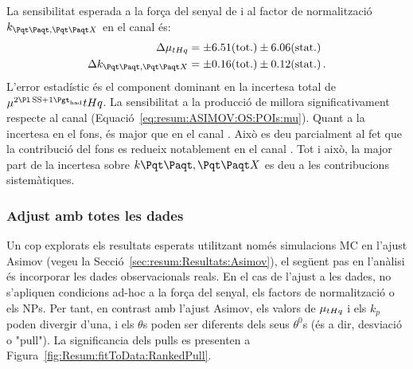 La sensibilitat esperada a la força del senyal de \tHq i al factor de normalització $k_{\ttbar, \ttX}$ en el canal \dilepSStau és:
\begin{align}
\Delta \mu_{\tHq} &= \pm 6.51 (\text{tot.}) \pm 6.06 (\text{stat.}) \label{eq:resum:Fit:ASIMOV:SS:mu} \\
\Delta k_{\ttbar, \ttX} 	&= \pm 0.16 (\text{tot.}) \pm 0.12 (\text{stat.})\label{eq:resum:Fit:ASIMOV:SS:k} \, .
\end{align}
L'error estadístic és el component dominant en la incertesa total de $\mu^{\dilepSStau}{\tHq}$. La sensibilitat a la producció de \tHq millora significativament respecte al canal \dilepOStau (Equació~\ref{eq:resum:ASIMOV:OS:POIs:mu}). Quant a la incertesa en el fons, és major que en el canal \dilepOStau. Això es deu parcialment al fet que la contribució del fons es redueix notablement en el canal \dilepSStau. Tot i això, la major part de la incertesa sobre $k{\ttbar, \ttX}$ es deu a les contribucions sistemàtiques. 



\subsubsection{Adjust amb totes les dades}
\label{sec:resum:Resultats:FullFit}

Un cop explorats els resultats esperats utilitzant només simulacions MC en l'ajust Asimov (vegeu la Secció~\ref{sec:resum:Resultats:Asimov}), 
el següent pas en l'anàlisi és incorporar les dades observacionals reals.
En el cas de l'ajust a les dades, no s'apliquen condicions ad-hoc a la força del senyal, els factors de normalització o els NPs. 
Per tant, en contrast amb l'ajust Asimov, els valors de $\mu_{tHq}$ i els $k_p$ poden divergir d'una, i els $\theta$s poden ser diferents dels seus $\theta^{0}$s (és a dir, desviació o "pull").
La significancia dels pulls es presenten a Figura~\ref{fig:Resum:fitToData:RankedPull}.


